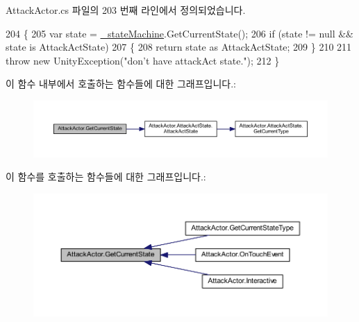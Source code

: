 Attack\+Actor.\+cs 파일의 203 번째 라인에서 정의되었습니다.


\begin{DoxyCode}
204     \{
205         var state = \hyperlink{class_attack_actor_ae8b11071e5df53e1bda6649bd9075571}{\_stateMachine}.GetCurrentState();
206         \textcolor{keywordflow}{if} (state != null && state is AttackActState)
207         \{
208             \textcolor{keywordflow}{return} state as AttackActState;
209         \}
210 
211         \textcolor{keywordflow}{throw} \textcolor{keyword}{new} UnityException(\textcolor{stringliteral}{"don't have attackAct state."});
212     \}
\end{DoxyCode}


이 함수 내부에서 호출하는 함수들에 대한 그래프입니다.\+:\nopagebreak
\begin{figure}[H]
\begin{center}
\leavevmode
\includegraphics[width=350pt]{class_attack_actor_ac231e370a4747dc36886f4158b289898_cgraph}
\end{center}
\end{figure}




이 함수를 호출하는 함수들에 대한 그래프입니다.\+:\nopagebreak
\begin{figure}[H]
\begin{center}
\leavevmode
\includegraphics[width=350pt]{class_attack_actor_ac231e370a4747dc36886f4158b289898_icgraph}
\end{center}
\end{figure}


